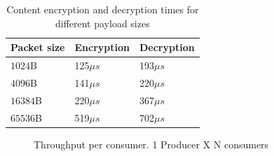 \begin{table}[!h]
\centering
\caption{Content encryption and decryption times for different payload sizes}
\label{my-label}
\begin{tabular}{|l|l|l|}
\hline
Packet size        & Encryption & Decryption \\ \hline
$1024$B & 125$\mu s$        & 193$\mu s$        \\ \hline
$4096$B & 141$\mu s$        & 220$\mu s$        \\ \hline
$16384$B & 220$\mu s$        & 367$\mu s$        \\ \hline
$65536$B & 519$\mu s$        & 702$\mu s$        \\ \hline
\end{tabular}
\end{table}

\begin{figure}[!t]
\centering
  \hfil
  \hfil
  \hfil
\caption{Throughput per consumer. 1 Producer X N consumers}\label{exp1}
\end{figure}


